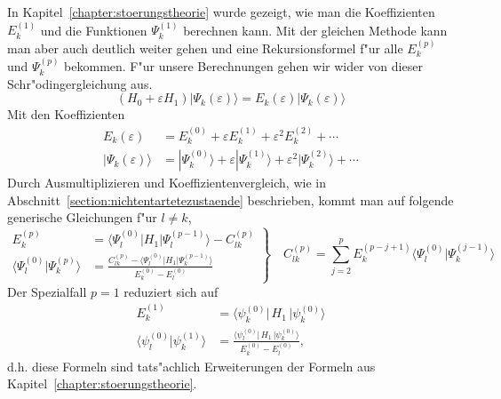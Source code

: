 \begin{refsection}
In Kapitel~\ref{chapter:stoerungstheorie} wurde gezeigt,
wie man die Koeffizienten $E_k^{(1)}$ und die 
Funktionen $\Psi_k^{(1)}$ berechnen kann. Mit der gleichen Methode kann man 
aber auch deutlich weiter gehen und eine Rekursionsformel f"ur alle 
$E_k^{(p)}$ und $\Psi_k^{(p)}$ bekommen.
F"ur unsere Berechnungen gehen wir wider von dieser Schr"odingergleichung aus.
\begin{equation}
(H_0+\varepsilon H_1)|\Psi_k(\varepsilon)\rangle
=
E_k(\varepsilon)|\Psi_k(\varepsilon)\rangle
\end{equation}
Mit den Koeffizienten
\begin{align*}
E_k(\varepsilon)
&=
E_k^{(0)}+\varepsilon E_k^{(1)}+\varepsilon^2 E_k^{(2)}+\dotsb
\\
|\Psi_k(\varepsilon)\rangle
&=
|\Psi_k^{(0)}\rangle+\varepsilon|\Psi_k^{(1)}\rangle+
\varepsilon^2|\Psi_k^{(2)}\rangle+\dotsb
\end{align*}
Durch Ausmultiplizieren und Koeffizientenvergleich,
wie in Abschnitt~\ref{section:nichtentartetezustaende} beschrieben,
kommt man auf folgende generische Gleichungen f"ur $l \neq k$,
\begin{equation}
\left.
\begin{aligned}
E_k^{(p)}
&=
\langle\Psi_l^{(0)}|H_1|\Psi_l^{(p-1)}\rangle-C_{lk}^{(p)}
\\
\langle\Psi_l^{(0)}|\Psi_k^{(p)}\rangle
&=
\frac{C_{lk}^{(p)}-\langle\Psi_l^{(0)}|H_1|\Psi_k^{(p-1)}\rangle}
{E_k^{(0)}-E_l^{(0)}}
\end{aligned}
\right\}
\quad
C_{lk}^{(p)}
=
\displaystyle\sum_{j=2}^{p} E_k^{(p-j+1)}
\langle\Psi_l^{(0)}|\Psi_k^{(j-1)}\rangle
\end{equation}
Der Spezialfall $p=1$ reduziert sich auf
\begin{equation}
\begin{aligned}
E_k^{(1)}
&=
\langle \psi_k^{(0)}|\, H_1 \,|\psi_k^{(0)}\rangle
\\
\langle\psi_l^{(0)}|\psi_k^{(1)}\rangle
&=
\frac{\langle \psi_l^{(0)}|\, H_1 \,|\psi_k^{(0)}\rangle}{E_k^{(0)}-E_l^{(0)}},
\end{aligned}
\end{equation}
d.h. diese Formeln sind tats"achlich Erweiterungen der Formeln aus
Kapitel~\ref{chapter:stoerungstheorie}.

\end{refsection}
